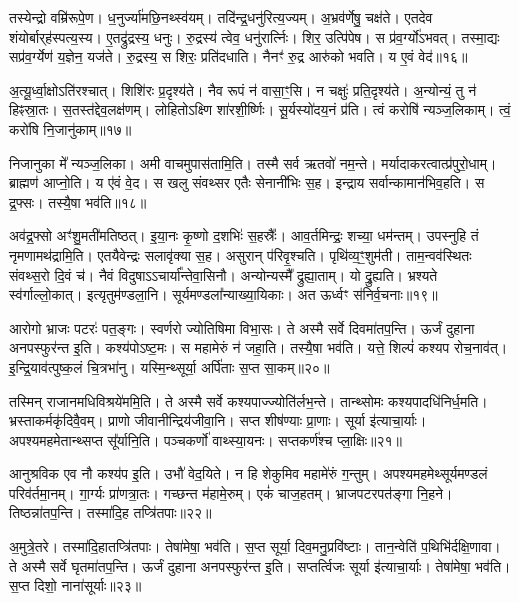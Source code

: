 तस्येन्द्रो वम्रि॑रूपे॒ण। ध॒नुर्ज्या॑मछि॒नथ्स्व॑यम्। 
तदि॑न्द्र॒धनु॑\-रित्य॒ज्यम्। अ॒भ्रव॑र्णेषु॒ चक्ष॑ते। 
एतदेव शंयोर्बार्‌ह॑स्पत्य॒स्य। ए॒तद्रु॑द्रस्य॒ धनुः। 
रु॒द्रस्य॑ त्वेव॒ धनु॑रार्त्निः। शिर॒ उत्पि॑पेष। 
स प्र॑व॒र्ग्यो॑ऽभवत्। तस्मा॒द्यः सप्र॑व॒र्ग्येण॑ य॒ज्ञेन॒ यज॑ते। 
रु॒द्रस्य॒ स शिरः॒ प्रति॑दधाति। नैनꣳ॑ रु॒द्र आरु॑को भवति। य ए॒वं वेद॑॥१६॥\anuvakamend


अ॒त्यू॒र्ध्वा॒क्षोऽति॑रश्चात्। शिशि॑रः प्र॒दृश्य॑ते। 
नैव रूपं न॑ वासा॒ꣳ॒सि। न चक्षुः॑ प्रति॒दृश्य॑ते। 
अ॒न्योन्यं॒ तु न॑ हिꣴस्रा॒तः। स॒तस्त॑द्देव॒लक्ष॑णम्। 
लोहितोऽक्ष्णि शा॑रशी॒र्ष्णिः। सू॒र्यस्यो॑दय॒नं प्र॑ति। 
त्वं करोषि॑ न्यञ्ज॒लिकाम्। त्वं॒ करो॑षि नि॒जानु॑काम्॥१७॥

निजानुका मे᳚ न्यञ्ज॒लिका। अमी वाचमुपास॑तामि॒ति। 
तस्मै सर्व ऋतवो॑ नम॒न्ते। मर्यादाकरत्वात्प्र॑\-पुरो॒धाम्। 
ब्राह्मण॑ आप्नो॒ति। य ए॑वं वे॒द। स खलु संवथ्सर एतैः सेनानी॑भिः स॒ह। 
इन्द्राय सर्वान्कामान॑भिव॒हति। स द्र॒फ्सः। तस्यै॒षा भव॑ति॥१८॥

अव॑द्र॒फ्सो अꣳ॑शु॒मती॑मतिष्ठत्। इ॒या॒नः कृ॒ष्णो द॒शभिः॑ स॒हस्रैः᳚। 
आव॒र्तमिन्द्रः॒ शच्या॒ धम॑न्तम्। उपस्नुहि तं नृमणामथ॑द्रामि॒ति। 
एतयैवेन्द्रः सलावृ॑क्या स॒ह। असुरान्‌ प॑रिवृ॒श्चति। 
पृथि॑व्य॒ꣳ॒शुम॑ती। ताम॒न्वव॑स्थितः संवथ्स॒रो दि॒वं च॑। 
नैवं विदुषाऽऽचार्या᳚न्तेवा॒सिनौ। अन्योन्यस्मै᳚ द्रुह्या॒ताम्। यो द्रु॒ह्यति। 
भ्रश्यते स्व॑र्गाल्लो॒कात्। इत्यृतुम॑ण्डला॒नि। 
सूर्यमण्डला᳚न्या\-ख्या॒यिकाः। अत ऊर्ध्वꣳ स॑निर्व॒चनाः॥१९॥\anuvakamend


आरोगो भ्राजः पटरः॑ पत॒ङ्गः। स्वर्णरो ज्योतिषिमा\sn{} विभा॒सः। 
ते अस्मै सर्वे दिवमा॑तप॒न्ति। ऊर्जं दुहाना अनपस्फुर॑न्त इ॒ति। 
कश्य॑पोऽष्ट॒मः। स महामेरुं न॑ जहा॒ति। 
तस्यै॒षा भव॑ति। यत्ते॒ शिल्पं॑ कश्यप रोच॒नाव॑त्। 
इ॒न्द्रि॒याव॑त्पुष्क॒लं चि॒त्रभा॑नु। यस्मि॒न्थ्सूर्या॒ अर्पि॑ताः स॒प्त सा॒कम्॥२०॥

तस्मिन्‌ राजानमधिविश्रये॑ममि॒ति। ते अस्मै सर्वे कश्यपाज्ज्यो\-ति॑र्लभ॒न्ते। 
तान्थ्सोमः कश्यपादधि॑निर्ध॒मति। भ्रस्ताकर्मकृ॑दिवै॒वम्। 
प्राणो जीवानीन्द्रिय॑जीवा॒नि। सप्त शी\ur{}ष॑ण्याः प्रा॒णाः। 
सूर्या इ॑त्याचा॒र्याः। अपश्यमहमेतान्थ्सप्त सू᳚र्यानि॒ति। 
पञ्चकर्णो॑ वाथ्स्या॒यनः। सप्तकर्ण॑श्च प्ला॒क्षिः॥२१॥

आनुश्रविक एव नौ कश्य॑प इ॒ति। उभौ॑ वेद॒यिते। 
न हि शेकुमिव महामे॑रुं ग॒न्तुम्। अपश्यमहमेथ्सूर्यमण्डलं परिव॑र्तमा॒नम्। 
गा॒र्ग्यः प्रा॑णत्रा॒तः। गच्छन्त म॑हामे॒रुम्। एकं॑ चाज॒हतम्। 
भ्राजपटरपत॑ङ्गा नि॒हने। तिष्ठन्ना॑तप॒न्ति। तस्मा॑दि॒ह तप्त्रि॑तपाः॥२२॥

अ॒मुत्रे॒तरे। तस्मा॑दि॒हातप्त्रि॑तपाः। तेषा॑मेषा॒ भव॑ति। 
स॒प्त सूर्या॒ दिव॒मनु॒प्रवि॑ष्टाः। तान॒न्वेति॑ प॒थिभि॑र्दक्षि॒णावा\sn{}। 
ते अस्मै सर्वे घृतमा॑तप॒न्ति। ऊर्जं दुहाना अनपस्फुर॑न्त इ॒ति। 
सप्तर्त्विजः सूर्या इ॑त्याचा॒र्याः। तेषा॑मेषा॒ भव॑ति। स॒प्त दिशो॒ नाना॑सूर्याः॥२३॥

